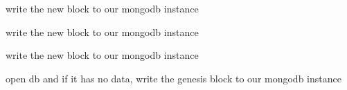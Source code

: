 
\begin{DoxyRefList}
\item[Member \mbox{\hyperlink{class_node_ac08fe080956d22ded0226fd3b47a4fdc}{Node\+::forge}} ()]\label{todo__todo000003}%
%
write the new block to our mongodb instance  
\item[Member \mbox{\hyperlink{class_node_a3431dcfd8525b2eb4bc74262363d0465}{Node\+::handle\+Block}} (\mbox{\hyperlink{class_block}{Block}} \&block, bool broadcast)]\label{todo__todo000001}%
%
write the new block to our mongodb instance  
\item[Member \mbox{\hyperlink{class_node_afca81a037e9e4fe4cbacf0a0637b7ce2}{Node\+::handle\+Blockchain}} (const std\+::string \&blockchain\+String) const]\label{todo__todo000002}%
%
write the new block to our mongodb instance  
\item[Member \mbox{\hyperlink{class_socket_communication_ac76c9fff0528a7f72726072a49a7109f}{Socket\+Communication\+::start\+P2\+PServer}} (int argc, char $\ast$$\ast$argv)]\label{todo__todo000004}%
%
open db and if it has no data, write the genesis block to our mongodb instance 
\end{DoxyRefList}